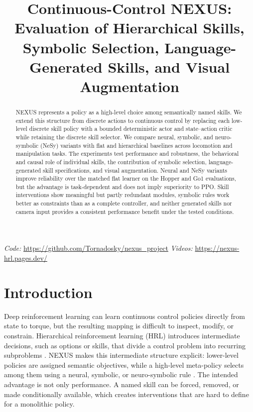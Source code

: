 \documentclass[conference,letterpaper,10pt]{IEEEtran}
\title{Continuous-Control NEXUS:\\
Evaluation of Hierarchical Skills, Symbolic Selection, Language-Generated Skills, and Visual Augmentation}
\author{\IEEEauthorblockN{Ivan Smirnov, Maryana Smirnova, Rosela Berberi, Anja Koroveshi}
\IEEEauthorblockA{Technical University of Darmstadt}}
\begin{document}
\maketitle

\begin{abstract}
NEXUS represents a policy as a high-level choice among semantically named skills. We extend this structure from discrete actions to continuous control by replacing each low-level discrete skill policy with a bounded deterministic actor and state--action critic while retaining the discrete skill selector. We compare neural, symbolic, and neuro-symbolic (NeSy) variants with flat and hierarchical baselines across locomotion and manipulation tasks. The experiments test performance and robustness, the behavioral and causal role of individual skills, the contribution of symbolic selection, language-generated skill specifications, and visual augmentation. Neural and NeSy variants improve reliability over the matched flat learner on the Hopper and Go1 evaluations, but the advantage is task-dependent and does not imply superiority to PPO. Skill interventions show meaningful but partly redundant modules, symbolic rules work better as constraints than as a complete controller, and neither generated skills nor camera input provides a consistent performance benefit under the tested conditions.
\end{abstract}

\vspace{2pt}
\noindent\textit{Code:} \url{https://github.com/Tornadosky/nexus_project}\hfill
\textit{Videos:} \url{https://nexus-hrl.pages.dev/}
\vspace{3pt}

\section{Introduction}
Deep reinforcement learning can learn continuous control policies directly from state to torque, but the resulting mapping is difficult to inspect, modify, or constrain. Hierarchical reinforcement learning (HRL) introduces intermediate decisions, such as options or skills, that divide a control problem into recurring subproblems \cite{sutton1999,bacon2017}. NEXUS makes this intermediate structure explicit: lower-level policies are assigned semantic objectives, while a high-level meta-policy selects among them using a neural, symbolic, or neuro-symbolic rule \cite{nexus}. The intended advantage is not only performance. A named skill can be forced, removed, or made conditionally available, which creates interventions that are hard to define for a monolithic policy.
\end{document}
